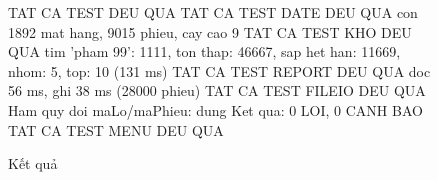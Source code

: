 \begin{figure}[htbp]
\begin{manhinh}
TAT CA TEST DEU QUA
TAT CA TEST DATE DEU QUA
  con 1892 mat hang, 9015 phieu, cay cao 9
TAT CA TEST KHO DEU QUA
  tim 'pham 99': 1111, ton thap: 46667, sap het han: 11669, nhom: 5, top: 10 (131 ms)
TAT CA TEST REPORT DEU QUA
  doc 56 ms, ghi 38 ms (28000 phieu)
TAT CA TEST FILEIO DEU QUA
Ham quy doi maLo/maPhieu: dung
Ket qua: 0 LOI, 0 CANH BAO
TAT CA TEST MENU DEU QUA
\end{manhinh}
\caption{Kết quả }
\label{fig:maketest}
\end{figure}
